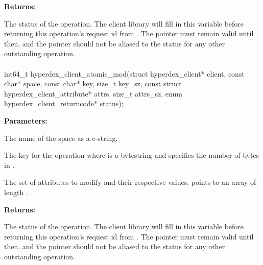 \noindent\textbf{Returns:}
\begin{description}[labelindent=\widthof{{\code{status}}},leftmargin=*,noitemsep,nolistsep,align=right]
\item[\code{status}] The status of the operation.  The client library will fill in this variable before returning this operation's request id from .  The pointer must remain valid until then, and the pointer should not be aliased to the status for any other outstanding operation.
\end{description}

\paragraph{}
\label{api:c:atomic_mod}
\begin{ccode}
int64_t hyperdex_client_atomic_mod(struct hyperdex_client* client,
                const char* space,
                const char* key, size_t key_sz,
                const struct hyperdex_client_attribute* attrs, size_t attrs_sz,
                enum hyperdex_client_returncode* status);
\end{ccode}
\funcdesc 

\noindent\textbf{Parameters:}
\begin{description}[labelindent=\widthof{{\code{attrs}, \code{attrs\_sz}}},leftmargin=*,noitemsep,nolistsep,align=right]
\item[\code{space}] The name of the space as a c-string.
\item[\code{key}, \code{key\_sz}] The key for the operation where  is a bytestring and  specifies the number of bytes in .
\item[\code{attrs}, \code{attrs\_sz}] The set of attributes to modify and their respective values.   points to an array of length .
\end{description}

\noindent\textbf{Returns:}
\begin{description}[labelindent=\widthof{{\code{status}}},leftmargin=*,noitemsep,nolistsep,align=right]
\item[\code{status}] The status of the operation.  The client library will fill in this variable before returning this operation's request id from .  The pointer must remain valid until then, and the pointer should not be aliased to the status for any other outstanding operation.
\end{description}

